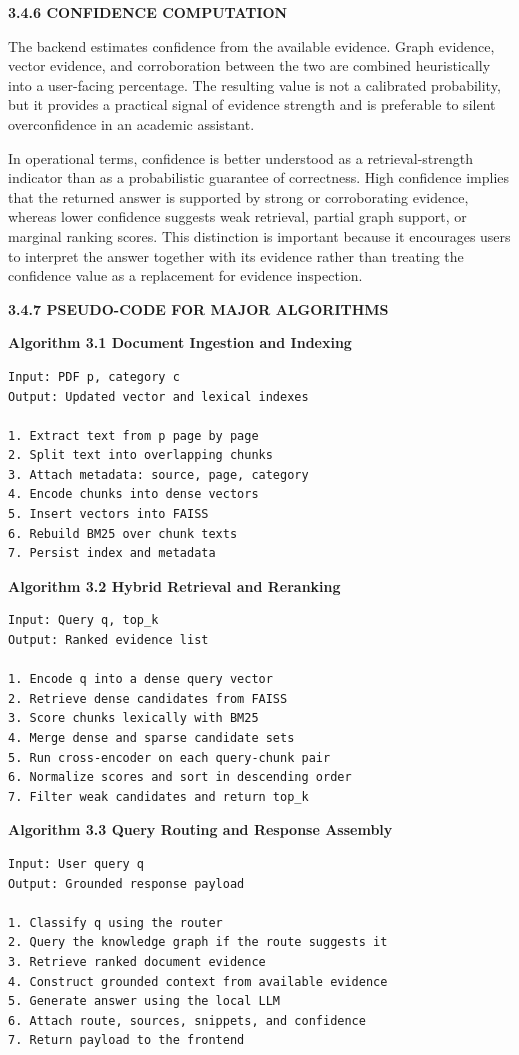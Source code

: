 \noindent\textbf{3.4.6 CONFIDENCE COMPUTATION}

The backend estimates confidence from the available evidence. Graph evidence, vector evidence, and corroboration between the two are combined heuristically into a user-facing percentage. The resulting value is not a calibrated probability, but it provides a practical signal of evidence strength and is preferable to silent overconfidence in an academic assistant.

In operational terms, confidence is better understood as a retrieval-strength indicator than as a probabilistic guarantee of correctness. High confidence implies that the returned answer is supported by strong or corroborating evidence, whereas lower confidence suggests weak retrieval, partial graph support, or marginal ranking scores. This distinction is important because it encourages users to interpret the answer together with its evidence rather than treating the confidence value as a replacement for evidence inspection.

\noindent\textbf{3.4.7 PSEUDO-CODE FOR MAJOR ALGORITHMS}

\textbf{Algorithm 3.1 Document Ingestion and Indexing}

\begin{verbatim}
Input: PDF p, category c
Output: Updated vector and lexical indexes

1. Extract text from p page by page
2. Split text into overlapping chunks
3. Attach metadata: source, page, category
4. Encode chunks into dense vectors
5. Insert vectors into FAISS
6. Rebuild BM25 over chunk texts
7. Persist index and metadata
\end{verbatim}

\textbf{Algorithm 3.2 Hybrid Retrieval and Reranking}

\begin{verbatim}
Input: Query q, top_k
Output: Ranked evidence list

1. Encode q into a dense query vector
2. Retrieve dense candidates from FAISS
3. Score chunks lexically with BM25
4. Merge dense and sparse candidate sets
5. Run cross-encoder on each query-chunk pair
6. Normalize scores and sort in descending order
7. Filter weak candidates and return top_k
\end{verbatim}

\textbf{Algorithm 3.3 Query Routing and Response Assembly}

\begin{verbatim}
Input: User query q
Output: Grounded response payload

1. Classify q using the router
2. Query the knowledge graph if the route suggests it
3. Retrieve ranked document evidence
4. Construct grounded context from available evidence
5. Generate answer using the local LLM
6. Attach route, sources, snippets, and confidence
7. Return payload to the frontend
\end{verbatim}

